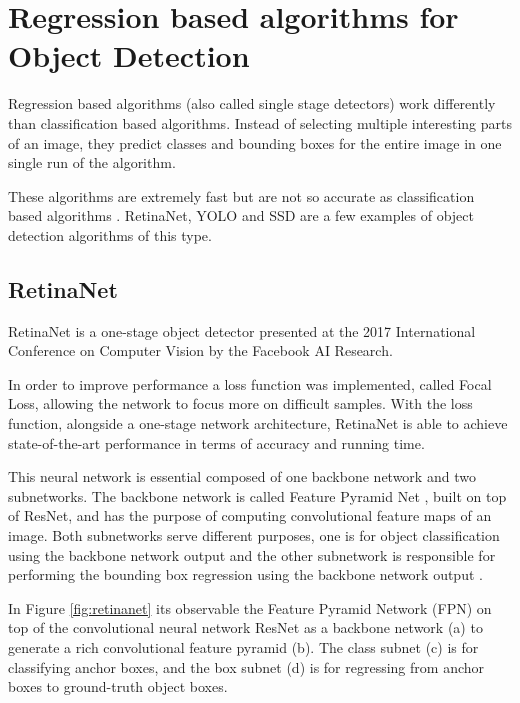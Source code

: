 

\section{Regression based algorithms for Object Detection}
\label{sec:regression}
\par Regression based algorithms (also called single stage detectors) work differently than classification based algorithms. Instead of selecting multiple interesting parts of an image, they predict classes and bounding boxes for the entire image in one single run of the algorithm.
\par These algorithms are extremely fast but are not so accurate as classification based algorithms \cite{Lin2017}. 
RetinaNet, YOLO and SSD are a few examples of object detection algorithms of this type. \par


    \subsection{RetinaNet}

    RetinaNet is a one-stage object detector presented at the 2017 International Conference on Computer Vision by the Facebook AI Research.\par

    In order to improve performance a loss function was implemented, called Focal Loss, allowing the network to focus more on difficult samples. With the loss function, alongside a one-stage network architecture, RetinaNet is able to achieve state-of-the-art performance in terms of accuracy and running time.\par

    This neural network is essential composed of one backbone network and two subnetworks. The backbone network is called Feature Pyramid Net \cite{lin2016feature}, built on top of ResNet, and has the purpose of computing convolutional feature maps of an image. Both subnetworks serve different purposes, one is for object classification using the backbone network output and the other subnetwork is responsible for performing the bounding box regression using the backbone network output \cite{Lin2017}. \par

    In Figure \ref{fig:retinanet} its observable the Feature Pyramid Network (FPN) on top of the convolutional neural network ResNet as a backbone network (a) to generate a rich convolutional feature pyramid (b). The class subnet (c) is for classifying anchor boxes, and the box subnet (d) is for regressing from anchor boxes to ground-truth object boxes. \par 


